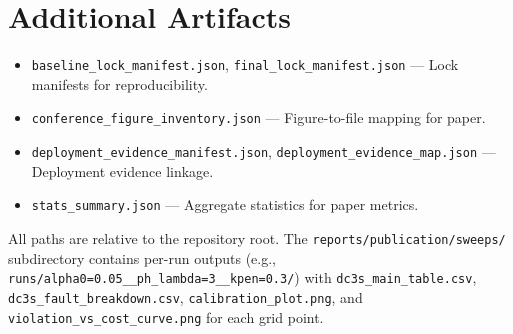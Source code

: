 \section{Additional Artifacts}

\begin{itemize}
\item \texttt{baseline\_lock\_manifest.json}, \texttt{final\_lock\_manifest.json} --- Lock manifests for reproducibility.
\item \texttt{conference\_figure\_inventory.json} --- Figure-to-file mapping for paper.
\item \texttt{deployment\_evidence\_manifest.json}, \texttt{deployment\_evidence\_map.json} --- Deployment evidence linkage.
\item \texttt{stats\_summary.json} --- Aggregate statistics for paper metrics.
\end{itemize}

All paths are relative to the repository root. The \texttt{reports/publication/sweeps/} subdirectory contains per-run outputs (e.g., \texttt{runs/alpha0=0.05\_\_ph\_lambda=3\_\_kpen=0.3/}) with \texttt{dc3s\_main\_table.csv}, \texttt{dc3s\_fault\_breakdown.csv}, \texttt{calibration\_plot.png}, and \texttt{violation\_vs\_cost\_curve.png} for each grid point.
